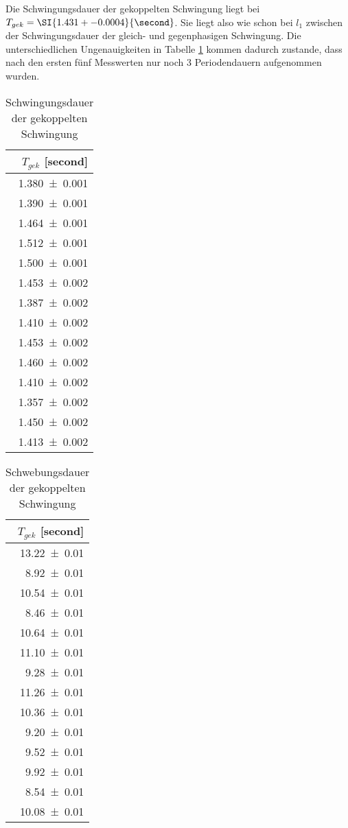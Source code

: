 Die Schwingungsdauer der gekoppelten Schwingung liegt bei
$T_{gek} = \SI{1.431+-0.0004}{\second}$. Sie liegt also wie schon bei $l_1$
zwischen der Schwingungsdauer der gleich- und gegenphasigen Schwingung.
Die unterschiedlichen Ungenauigkeiten in Tabelle \ref{tab:l2tgek} kommen dadurch
zustande, dass nach den ersten fünf Messwerten nur noch 3 Periodendauern
aufgenommen wurden.
\begin{table}
 \noindent
 \centering
 \caption{Schwingungsdauer der gekoppelten
 Schwingung}
 \label{tab:l2tgek}
 \begin{tabular}{r}
 \toprule
  {$T_{gek}$ [\si{second}]} \\
 \midrule
    \num{1.380 +- 0.001}\\
    \num{1.390 +- 0.001}\\
    \num{1.464 +- 0.001}\\
    \num{1.512 +- 0.001}\\
    \num{1.500 +- 0.001}\\
    \num{1.453 +- 0.002}\\
    \num{1.387 +- 0.002}\\
    \num{1.410 +- 0.002}\\
    \num{1.453 +- 0.002}\\
    \num{1.460 +- 0.002}\\
    \num{1.410 +- 0.002}\\
    \num{1.357 +- 0.002}\\
    \num{1.450 +- 0.002}\\
    \num{1.413 +- 0.002}\\
 \bottomrule
 \end{tabular}
\end{table}

\begin{table}
 \noindent
 \centering
 \caption{Schwebungsdauer der gekoppelten
 Schwingung}
 \label{tab:l1tschwebung}
 \begin{tabular}{r}
 \toprule
  {$T_{gek}$ [\si{second}]} \\
 \midrule
    \num{13.22 +- 0.01}\\
    \num{8.92 +- 0.01}\\
    \num{10.54 +- 0.01}\\
    \num{8.46 +- 0.01}\\
    \num{10.64 +- 0.01}\\
    \num{11.10 +- 0.01}\\
    \num{9.28 +- 0.01}\\
    \num{11.26 +- 0.01}\\
    \num{10.36 +- 0.01}\\
    \num{9.20 +- 0.01}\\
    \num{9.52 +- 0.01}\\
    \num{9.92 +- 0.01}\\
    \num{8.54 +- 0.01}\\
    \num{10.08 +- 0.01}\\
 \bottomrule
 \end{tabular}
\end{table}

